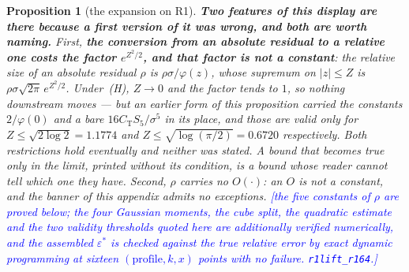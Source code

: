 \documentclass[11pt,a4paper]{article}
\theoremstyle{plain}
\newtheorem{proposition}[theorem]{Proposition}
\theoremstyle{definition}
\theoremstyle{remark}
\newcommand{\STATUS}[1]{\textcolor{blue}{\textsf{[#1]}}}
\begin{document}
\begin{proposition}[the expansion on R1]
\medskip\noindent
\textbf{Two features of this display are there because a first version of it was wrong, and
both are worth naming.} First, \textbf{the conversion from an absolute residual to a relative
one costs the factor $e^{Z^{2}/2}$, and that factor is not a constant}: the relative size of an
absolute residual $\rho$ is $\rho\sigma/\varphi(z)$, whose supremum on $|z|\le Z$ is
$\rho\sigma\sqrt{2\pi}\,e^{Z^{2}/2}$. Under~\textup{(H)}, $Z\to0$ and the factor tends to $1$,
so nothing downstream moves --- but an earlier form of this proposition carried the constants
$2/\varphi(0)$ and a bare $16C_{\mathrm{T}}S_5/\sigma^{5}$ in its place, and those are valid
only for $Z\le\sqrt{2\log2}=1.1774$ and $Z\le\sqrt{\log(\pi/2)}=0.6720$ respectively. Both
restrictions hold eventually and neither was stated. \emph{A bound that becomes true only in
the limit, printed without its condition, is a bound whose reader cannot tell which one they
have.} Second, $\rho$ carries no $O(\cdot)$: an $O$ is not a constant, and the banner of this
appendix admits no exceptions.
\STATUS{the five constants of $\rho$ are proved below; the four Gaussian moments, the cube
split, the quadratic estimate and the two validity thresholds quoted here are additionally
verified numerically, and the assembled $\varepsilon^{*}$ is checked against the true relative
error by exact dynamic programming at sixteen $(\text{profile},k,x)$ points with no failure.
\texttt{r1lift\_r164}.}
\end{proposition}
\end{document}
